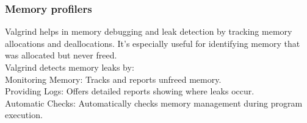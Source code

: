 \documentclass{article}
\begin{document}
\subsubsection{Memory profilers}
Valgrind helps in memory debugging and leak detection by tracking memory allocations and deallocations. It's especially useful for identifying memory that was allocated but never freed.\\
Valgrind detects memory leaks by:\\

Monitoring Memory: Tracks and reports unfreed memory.\\

Providing Logs: Offers detailed reports showing where leaks occur.\\

Automatic Checks: Automatically checks memory management during program execution.\\
\end{document}
